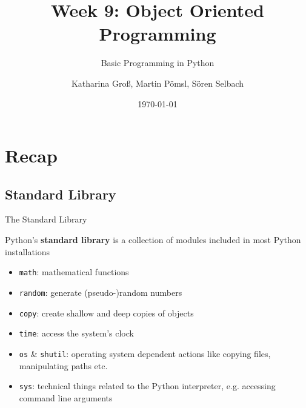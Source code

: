 



\title[Object Oriented Programming]{Week 9: Object Oriented Programming}
\subtitle{Basic Programming in Python}

\author[kgross, mpoemsl, sselbach]{Katharina Groß, Martin Pömsl, Sören Selbach}

\date{\today}

\begin{frame}[plain]
     \titlepage
\end{frame}

\begin{frame}
    \tableofcontents
\end{frame}

\section{Recap}

\subsection{Standard Library}

\begin{frame}{The Standard Library}

    Python's {\bf standard library} is a collection of modules included in most Python installations

    \begin{itemize}
        \item {\tt math}: mathematical functions
        \item {\tt random}: generate (pseudo-)random numbers
        \item {\tt copy}: create shallow and deep copies of objects
        \item {\tt time}: access the system's clock
        \item {\tt os} \& {\tt shutil}: operating system dependent actions like copying files, manipulating paths etc.
        \item {\tt sys}: technical things related to the Python interpreter, e.g. accessing command line arguments
    \end{itemize}


\end{frame}

